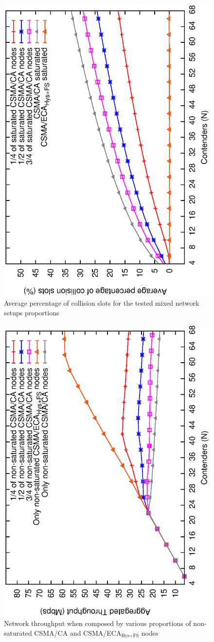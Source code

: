 \documentclass[a4paper,journal]{IEEEtran}
\begin{document}
	\begin{figure}[tb]
		\centering
		\includegraphics[width=0.7\linewidth,angle=-90]{figures/saturated/mixed/collisions-mixed/collisions-mixed-saturated.eps}
		\caption{Average percentage of collision slots for the tested mixed network setups proportions}
		\label{fig:mixedCollisions-sat}
	\end{figure}
	
	\begin{figure}[tb!!!]
		\centering
		\includegraphics[width=0.7\linewidth,angle=-90]{figures/unsaturated/mixed/throughput-mixed/throughput-unsaturated-mixed.eps}
		\caption{Network throughput when composed by various proportions of non-saturated CSMA/CA and CSMA/ECA$_{\text{Hys+FS}}$ nodes}
		\label{fig:mixedThroughput-unsat}
	\end{figure}
	
\end{document}
